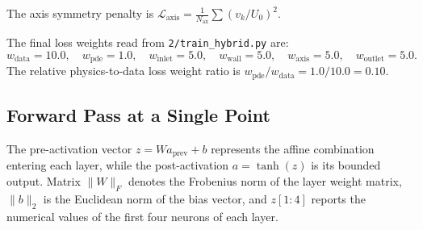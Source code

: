 \documentclass[11pt,a4paper]{article}
\begin{document}
The axis symmetry penalty is $\mathcal{L}_{\mathrm{axis}} = \frac{1}{N_{\mathrm{ax}}}\sum (v_k/U_0)^2$.

The final loss weights read from \texttt{2/train\_hybrid.py} are:
\begin{equation}
w_{\mathrm{data}} = 10.0, \quad w_{\mathrm{pde}} = 1.0, \quad w_{\mathrm{inlet}} = 5.0, \quad w_{\mathrm{wall}} = 5.0, \quad w_{\mathrm{axis}} = 5.0, \quad w_{\mathrm{outlet}} = 5.0.
\end{equation}
The relative physics-to-data loss weight ratio is $w_{\mathrm{pde}} / w_{\mathrm{data}} = 1.0 / 10.0 = \mathbf{0.10}$.

\subsection{Forward Pass at a Single Point}
The pre-activation vector $z = W a_{\mathrm{prev}} + b$ represents the affine combination entering each layer, while the post-activation $a = \tanh(z)$ is its bounded output. Matrix $\|W\|_F$ denotes the Frobenius norm of the layer weight matrix, $\|b\|_2$ is the Euclidean norm of the bias vector, and $z[1:4]$ reports the numerical values of the first four neurons of each layer.
\end{document}
